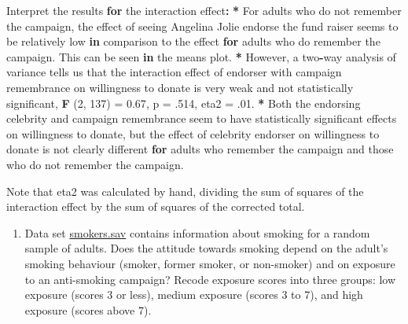 \documentclass[a4paper]{book}
\newenvironment{Shaded}{\begin{snugshade}}{\end{snugshade}}
\newcommand{\KeywordTok}[1]{\textcolor[rgb]{0,0,0}{\textbf{#1}}}
\newcommand{\DecValTok}[1]{\textcolor[rgb]{0.00,0.00,0.00}{#1}}
\newcommand{\FloatTok}[1]{\textcolor[rgb]{0.00,0.00,0.00}{#1}}
\newcommand{\StringTok}[1]{\textcolor[rgb]{0.00,0.00,0.00}{#1}}
\newcommand{\ControlFlowTok}[1]{\textcolor[rgb]{0.00,0.00,0.00}{\textbf{#1}}}
\newcommand{\OperatorTok}[1]{\textcolor[rgb]{0.00,0.00,0.00}{\textbf{#1}}}
\newcommand{\ErrorTok}[1]{\textcolor[rgb]{0.00,0.00,0.00}{\textbf{#1}}}
\newcommand{\NormalTok}[1]{#1}
\providecommand{\tightlist}{%
  \setlength{\itemsep}{0pt}\setlength{\parskip}{0pt}}
\theoremstyle{definition}
\theoremstyle{definition}
\theoremstyle{definition}
\theoremstyle{remark}
\begin{document}
\begin{Shaded}
\begin{Highlighting}[]
\NormalTok{Interpret the results }\ControlFlowTok{for}\NormalTok{ the interaction effect}\OperatorTok{:}\StringTok{  }
\StringTok{  }
\ErrorTok{*}\StringTok{ }\NormalTok{For adults who do not remember the campaign, the effect of seeing Angelina  }
\NormalTok{Jolie endorse the fund raiser seems to be relatively low }\ControlFlowTok{in}\NormalTok{ comparison to the  }
\NormalTok{effect }\ControlFlowTok{for}\NormalTok{ adults who do remember the campaign. This can be seen }\ControlFlowTok{in}\NormalTok{ the means  }
\NormalTok{plot.  }
\OperatorTok{*}\StringTok{ }\NormalTok{However, a two}\OperatorTok{-}\NormalTok{way analysis of variance tells us that the interaction effect  }
\NormalTok{of endorser with campaign remembrance on willingness to donate is very weak  }
\NormalTok{and not statistically significant, }\KeywordTok{F}\NormalTok{ (}\DecValTok{2}\NormalTok{, }\DecValTok{137}\NormalTok{) =}\StringTok{ }\FloatTok{0.67}\NormalTok{, p =}\StringTok{ }\NormalTok{.}\DecValTok{514}\NormalTok{, eta2 =}\StringTok{ }\NormalTok{.}\DecValTok{01}\NormalTok{.  }
\OperatorTok{*}\StringTok{ }\NormalTok{Both the endorsing celebrity and campaign remembrance seem to have  }
\NormalTok{statistically significant effects on willingness to donate, but the effect of  }
\NormalTok{celebrity endorser on willingness to donate is not clearly different }\ControlFlowTok{for}  
\NormalTok{adults who remember the campaign and those who do not remember the campaign.  }
  
\NormalTok{Note that eta2 was calculated by hand, dividing the sum of squares of the  }
\NormalTok{interaction effect by the sum of squares of the corrected total.  }
\end{Highlighting}
\end{Shaded}

\begin{enumerate}
\def\labelenumi{\arabic{enumi}.}
\setcounter{enumi}{2}
\tightlist
\item
  Data set \href{http://82.196.4.233:3838/data/smokers.sav}{smokers.sav}
  contains information about smoking for a random sample of adults. Does
  the attitude towards smoking depend on the adult's smoking behaviour
  (smoker, former smoker, or non-smoker) and on exposure to an
  anti-smoking campaign? Recode exposure scores into three groups: low
  exposure (scores 3 or less), medium exposure (scores 3 to 7), and high
  exposure (scores above 7).
\end{enumerate}
\end{document}
